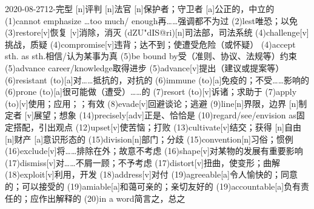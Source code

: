 \documentclass[12pt]{ctexart}
\begin{document}
\begin{wordlist}{2020-08-27}{12-完型}
  [n]{评判}
  [n]{法官}
  [n]{保护者；守卫者}
  [a]{公正的，中立的}
  \word(1){cannot emphasize \dots too much/ enough}{再……强调都不为过}
  \word(2){lest}{唯恐；以免}
  \word[2020-09-11](3){restore}[v]{恢复}
  [v]{消除，消灭}
  (dZU"dIS@ri)[n]{司法部，司法系统}
  \word(4){challenge}[v]{挑战，质疑}
  \word(4){compromise}[v]{违背；达不到；使遭受危险（或怀疑）}
  \word(4){accept sth. as sth.}{相信/认为某事为真}
  \word[2020-09-03](5){be bound by}{受（准则、协议、法规等）约束}
  \word(5){advance career/knowledge}{取得进步}
  \word[2020-09-13](5){advance}[v]{提出（建议或提案等）}
  \word(6){resistant (to)}[a]{对……抵抗的，对抗的}
  \word(6){immune (to)}[a]{免疫的；不受……影响的}
  \word[2020-08-29](6){prone (to)}[a]{很可能做（遭受）……的}
  \word(7){resort (to)}[v]{诉诸；求助于}
  \word(7){apply (to)}[v]{使用；应用；；有效}
  \word(8){evade}[v]{回避谈论；逃避}
  \word(9){line}[n]{界限，边界}
  [n]{制定者}
  [v]{展望；想象}
  \word(14){precisely}[adv]{正是、恰恰是}
  \word(10){regard/see/envision as}{固定搭配，引出观点}
  \word(12){upset}[v]{使苦恼；打败}
  \word(13){cultivate}[v]{结交；获得}
  [n]{自由}
  [n]{财产}
  [a]{意识形态的}
  \word(15){division}[n]{部门；分歧}
  \word(15){convention}[n]{习俗；惯例}
  \word(16){exclude}[v]{将……排除在外；故意不考虑}
  \word(16){shape}[v]{对某物的发展有重要影响}
  \word(17){dismiss}[v]{对……不屑一顾；不予考虑}
  \word[2020-08-29](17){distort}[v]{扭曲，使变形；曲解}
  \word[2020-08-29](18){exploit}[v]{利用，开发}
  \word(18){address}[v]{对付}
  \word(19){agreeable}[a]{令人愉快的；同意的；可以接受的}
  \word[2020-08-31](19){amiable}[a]{和蔼可亲的；亲切友好的}
  \word[2020-08-29](19){accountable}[a]{负有责任的；应作出解释的}
  \word(20){in a word}{简言之，总之}
\end{wordlist}
\end{document}
